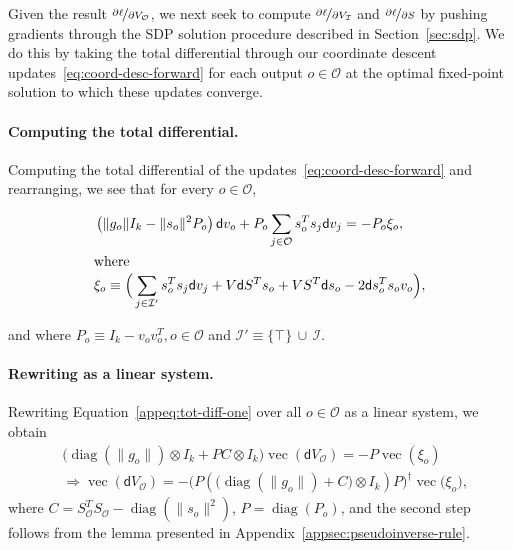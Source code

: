 \documentclass{article}
\DeclareMathOperator{\diag}{diag}
\DeclareMathOperator{\vect}{vec}
\newcommand{\norm}[1] {\|#1\|}
\newcommand{\dd}{\mathsf{d}}
\newcommand{\outdex}{o}
\newcommand{\truthvar}{\top}
\newcommand{\inset}{\mathcal{I}}
\newcommand{\outset}{\mathcal{O}}
\begin{document}
	Given the result $\nicefrac{\partial \ell}{\partial V_{\outset}}$, we next seek to compute $\nicefrac{\partial \ell}{\partial V_{\inset}}$ and $\nicefrac{\partial \ell}{\partial S}$ by pushing gradients through the SDP solution procedure described in Section~\ref{sec:sdp}.
	We do this by taking the total differential through our coordinate descent updates~\eqref{eq:coord-desc-forward} for each output $\outdex \in \outset$ at the optimal fixed-point solution to which these updates converge.
	
	\paragraph{Computing the total differential.} Computing the total differential of the updates~\eqref{eq:coord-desc-forward} and rearranging, we see that for every $\outdex \in \outset$,
	\begin{small}
		\begin{align}
			&\left(\|g_{\outdex}\| I_k -\norm{s_{\outdex}}^2 P_{\outdex} \right)\dd v_{\outdex} + P_{\outdex} \sum_{j\in \outset} s_{\outdex}^T s_j \dd v_j = -P_{\outdex}\xi_{\outdex}, \label{appeq:tot-diff-one}\\
			\intertext{\begin{normalsize}where\end{normalsize}}
			&\xi_{\outdex} \equiv \Big( \sum_{j \in \inset'} s_{\outdex}^Ts_j \dd v_j + V \dd S^Ts_{\outdex} + VS^T \dd s_{\outdex} -2\dd s_{\outdex}^T s_{\outdex} v_{\outdex} \Big), \label{eq:xi}
		\end{align}
	\end{small}
	and where $P_{\outdex} \equiv I_k - v_{\outdex} v_{\outdex}^T, \outdex \in \outset$ and $\inset' \equiv \{ \truthvar \}\, \cup\, \inset$.
	
	\paragraph{Rewriting as a linear system.} Rewriting Equation~\ref{appeq:tot-diff-one} over all $\outdex \in \outset$ as a linear system, we obtain
	\begin{equation}
		\label{appeq:tot-diff}
		\begin{aligned}
			&\Big(\diag(\|g_{\outdex}\|)\otimes I_k + P C \otimes I_k \Big)\vect(\dd V_{\outset}) = -P \vect(\xi_{\outdex}) \\
			&\Rightarrow \vect(\dd V_{\outset}) = -\Big(P (\big(\diag(\|g_{\outdex}\|) + C \big) \otimes I_k )P\Big)^{\dagger} \vect({\xi_{\outdex})},
		\end{aligned}
	\end{equation}
	where $C = S_{\outset}^T S_{\outset} - \diag(\norm{s_{\outdex}}^2)$, $P = \diag(P_{\outdex})$, and the second step follows from the lemma presented in Appendix~\ref{appsec:pseudoinverse-rule}.
	
\end{document}
